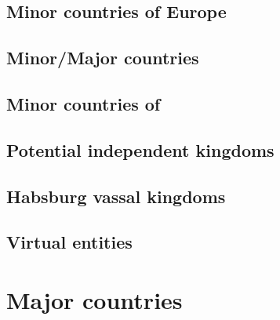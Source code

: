 \section{Minor countries of Europe}

\section{Minor/Major countries}

\section{Minor countries of \ROTW}

\section{Potential independent kingdoms}

\section{Habsburg vassal kingdoms}\label{chAppendix:Habsburg vassal kingdoms}

\section{Virtual entities}


\chapter{Major countries}

\makeatletter
\newcommand{\list@currentcountry}{}
\newcommand{\list@currentblason}{}
\newcommand{\set@currentcountry}[2][]{%
  \renewcommand{\list@currentcountry}{#2}%
  \ifx#1\relax\relax%
  \renewcommand{\list@currentblason}{#2}%
  \else%
  \renewcommand{\list@currentblason}{#1}%
  \fi}
\newcommand{\set@currentblason}[1]{%
  \renewcommand{\list@currentblason}{#1}}

\newcommand{\list@land}[1]{%
  \subsectionJ{List of all land leaders}{\blason{\list@currentblason} \quad
    #1}
  \listleader{leaders\list@currentcountry T}}
\newcommand{\list@landfull}{%
  \list@land{\Xmonarque\ \Xgeneral\ \Xingenieur\ \Xconquistador\
    \Xgouverneur}}
\newcommand{\list@landKG}{%
  \list@land{\Xmonarque\ \Xgeneral}}
\newcommand{\list@landKGIC}{%
  \list@land{\Xmonarque\ \Xgeneral\ \Xingenieur\ \Xconquistador}}

